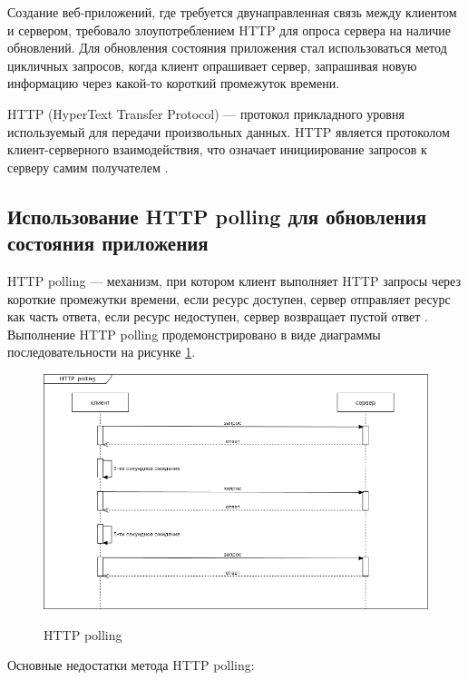 Создание веб-приложений, где требуется двунаправленная связь между клиентом и сервером, требовало злоупотреблением HTTP для опроса сервера на наличие обновлений. Для обновления состояния приложения стал использоваться метод цикличных запросов, когда клиент опрашивает сервер, запрашивая новую информацию через какой-то короткий промежуток времени.

HTTP (HyperText Transfer Protocol) — протокол прикладного уровня используемый для передачи произвольных данных. HTTP является протоколом клиент-серверного взаимодействия, что означает инициирование запросов к серверу самим получателем \cite{HttpMain}.

\subsection{Использование HTTP polling для обновления состояния приложения}

HTTP polling — механизм, при котором клиент выполняет HTTP запросы через короткие промежутки времени, если ресурс доступен, сервер отправляет ресурс как часть ответа, если ресурс недоступен, сервер возвращает пустой ответ \cite{HttpPolling}. Выполнение HTTP polling продемонстрировано в виде диаграммы последовательности на рисунке \ref{fig:http-polling}.

\begin{figure}[H]
\begin{center}
\includegraphics[width=1.0\hsize]{fig/http-polling.png}\\[2mm]
\caption{HTTP polling}\label{fig:http-polling}
\end{center}
\end{figure}

Основные недостатки метода HTTP polling:

